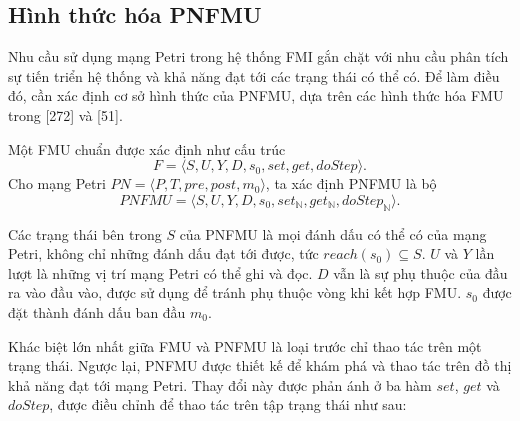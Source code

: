 \subsection{Hình thức hóa PNFMU}
Nhu cầu sử dụng mạng Petri trong hệ thống FMI gắn chặt với nhu cầu phân tích sự tiến triển hệ thống và khả năng đạt tới các trạng thái có thể có. Để làm điều đó, cần xác định cơ sở hình thức của PNFMU, dựa trên các hình thức hóa FMU trong [272] và [51].

Một FMU chuẩn được xác định như cấu trúc
\[
F=\langle S,U,Y,D,s_0,set,get,doStep\rangle.
\]
Cho mạng Petri $PN=\langle P,T,pre,post,m_0\rangle$, ta xác định PNFMU là bộ
\[
PNFMU=\langle S,U,Y,D,s_0,set_{\mathbb{N}},get_{\mathbb{N}},doStep_{\mathbb{N}}\rangle.
\]

Các trạng thái bên trong $S$ của PNFMU là mọi đánh dấu có thể có của mạng Petri, không chỉ những đánh dấu đạt tới được, tức $reach(s_0)\subseteq S$. $U$ và $Y$ lần lượt là những vị trí mạng Petri có thể ghi và đọc. $D$ vẫn là sự phụ thuộc của đầu ra vào đầu vào, được sử dụng để tránh phụ thuộc vòng khi kết hợp FMU. $s_0$ được đặt thành đánh dấu ban đầu $m_0$.

Khác biệt lớn nhất giữa FMU và PNFMU là loại trước chỉ thao tác trên một trạng thái. Ngược lại, PNFMU được thiết kế để khám phá và thao tác trên đồ thị khả năng đạt tới mạng Petri. Thay đổi này được phản ánh ở ba hàm $set$, $get$ và $doStep$, được điều chỉnh để thao tác trên tập trạng thái như sau:

